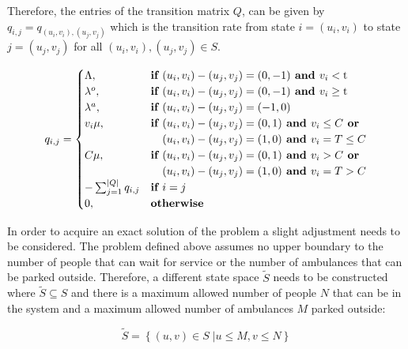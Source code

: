 Therefore, the entries of the transition matrix \(Q\), can be given by \( q_{i,j} = q_{(u_i, v_i),(u_j, v_j)} \) which is the transition rate from state \( i = (u_i, v_i) \) to state \( j = (u_j , v_j) \) for all \( (u_i, v_i), (u_j, v_j) \in S \).

\begin{equation}
    q_{i, j} = 
    \begin{cases}
        \Lambda, & \textbf{if } (u_i, v_i) - (u_j, v_j) = (0,-1) \textbf{ and } v_i < \text{t} \\
        \lambda^o, & \textbf{if } (u_i, v_i) - (u_j, v_j) = (0,-1) \textbf{ and } v_i \geq \text{t} \\
        \lambda^a, & \textbf{if } (u_i, v_i) - (u_j, v_j) = (-1,0) \\
        v_i \mu, & \textbf{if } (u_i, v_i) - (u_j, v_j) = (0,1) \textbf{ and } v_i \leq C \textbf{ or} \\ & \hspace{0.37cm}(u_i, v_i) - (u_j, v_j) = (1,0) \textbf{ and } v_i = T \leq C \\
        C \mu, & \textbf{if } (u_i, v_i) - (u_j, v_j) = (0,1) \textbf{ and } v_i > C \textbf{ or} \\ & \hspace{0.37cm}(u_i, v_i) - (u_j, v_j) = (1,0) \textbf{ and } v_i = T > C\\
        -\sum_{j=1}^{|Q|}{q_{i,j}} & \textbf{if } i = j \\
        0, & \textbf{otherwise}
    \end{cases}
\end{equation}

In order to acquire an exact solution of the problem a slight adjustment needs to be considered. The problem defined above assumes no upper boundary to the number of people that can wait for service or the number of ambulances that can be parked outside. Therefore, a different state space \( \tilde S \) needs to be constructed where \( \tilde S \subseteq S \) and there is a maximum allowed number of people \( N \) that can be in the system and a maximum allowed number of ambulances \( M \) parked outside:

\begin{equation}
    \tilde S = \left\{ (u, v) \in S\;| u \leq M, v\leq N \right\}
\end{equation}


